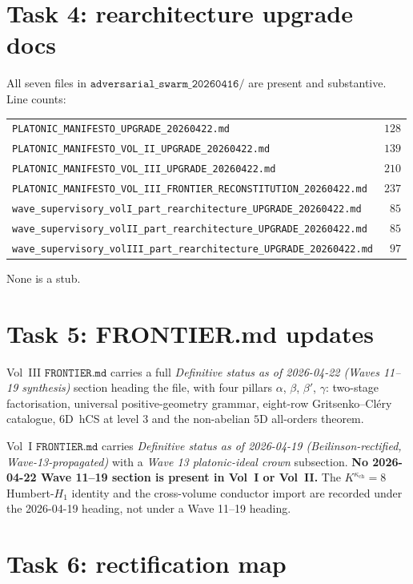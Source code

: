 \documentclass[11pt]{article}
\providecommand{\kch}{\kappa_{\mathrm{ch}}}
\begin{document}
\section{Task 4: rearchitecture upgrade docs}

All seven files in
$\texttt{adversarial\_swarm\_20260416/}$ are present and substantive.
Line counts:
\begin{center}
\begin{tabular}{lr}
 \texttt{PLATONIC\_MANIFESTO\_UPGRADE\_20260422.md} & $128$ \\
 \texttt{PLATONIC\_MANIFESTO\_VOL\_II\_UPGRADE\_20260422.md} & $139$ \\
 \texttt{PLATONIC\_MANIFESTO\_VOL\_III\_UPGRADE\_20260422.md} & $210$ \\
 \texttt{PLATONIC\_MANIFESTO\_VOL\_III\_FRONTIER\_RECONSTITUTION\_20260422.md} & $237$ \\
 \texttt{wave\_supervisory\_volI\_part\_rearchitecture\_UPGRADE\_20260422.md} & $85$ \\
 \texttt{wave\_supervisory\_volII\_part\_rearchitecture\_UPGRADE\_20260422.md} & $85$ \\
 \texttt{wave\_supervisory\_volIII\_part\_rearchitecture\_UPGRADE\_20260422.md} & $97$ \\
\end{tabular}
\end{center}
None is a stub.

\section{Task 5: FRONTIER.md updates}

Vol~III $\texttt{FRONTIER.md}$ carries a full \emph{Definitive status
as of 2026-04-22 (Waves 11--19 synthesis)} section heading the file,
with four pillars $\alpha$, $\beta$, $\beta'$, $\gamma$: two-stage
factorisation, universal positive-geometry grammar, eight-row
Gritsenko--Cl\'ery catalogue, $6$D~hCS at level $3$ and the
non-abelian $5$D all-orders theorem.

Vol~I $\texttt{FRONTIER.md}$ carries \emph{Definitive status as of
2026-04-19 (Beilinson-rectified, Wave-13-propagated)} with a
\emph{Wave 13 platonic-ideal crown} subsection. \textbf{No 2026-04-22
Wave 11--19 section is present in Vol~I or Vol~II.} The $K^{\kch} = 8$
Humbert-$H_1$ identity and the cross-volume conductor import are
recorded under the 2026-04-19 heading, not under a Wave 11--19
heading.

\section{Task 6: rectification map}
\end{document}

